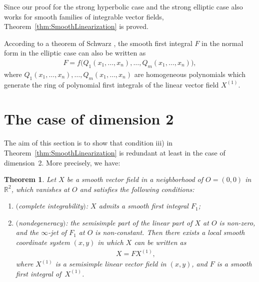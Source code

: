 \documentclass[pdftex]{sigma}
\numberwithin{equation}{section}
\newtheorem{thm}{Theorem}[section]
\newcommand{\bbR}{\mathbb R}
\begin{document}
Since our proof for the strong hyperbolic case and the strong elliptic case also works for smooth families of integrable vector f\/ields,
Theorem~\ref{thm:SmoothLinearization} is proved.

\begin{Remark}
According to a theorem of Schwarz \cite{Schwarz-Invariant1975},
the smooth f\/irst integral $F$ in the normal form in the elliptic case can also be written as
\begin{gather*}
 F = f\big(Q_1(x_1,\dots,x_n), \dots, Q_m(x_1,\dots,x_n)\big),
\end{gather*}
where $Q_1(x_1,\dots,x_n), \dots, Q_m(x_1,\dots,x_n)$ are homogeneous polynomials which generate
the ring of polynomial f\/irst integrals of the linear vector f\/ield $X^{(1)}$.
\end{Remark}


\section{The case of dimension 2}\label{section4}

The aim of this section is to show that condition iii) in Theorem~\ref{thm:SmoothLinearization}
is redundant at least in the case of dimension~2. More precisely, we have:

\begin{thm} \label{thm:2Dsmoothlinearization}
Let $X$ be a smooth vector field in a neighborhood of $O = (0,0)$ in $\bbR^2$,
which vanishes at $O$ and satisfies the following conditions:
\begin{enumerate}\itemsep=0pt
\item[$i)$] $($complete integrability$)$: $X$ admits a smooth first integral $F_1$;
\item[$ii)$] $($nondegeneracy$)$: the semisimple part of the linear part of $X$ at $O$ is non-zero, and the $\infty$-jet
of $F_1$ at $O$ is non-constant.
Then there exists a local smooth coordinate system $(x,y)$ in which $X$ can be written as
\begin{gather*}
X = F X^{(1)},
\end{gather*}
where $X^{(1)}$ is a semisimple linear vector field in $(x,y)$, and $F$ is a smooth first
integral of~$X^{(1)}$.
\end{enumerate}
\end{thm}
\end{document}
